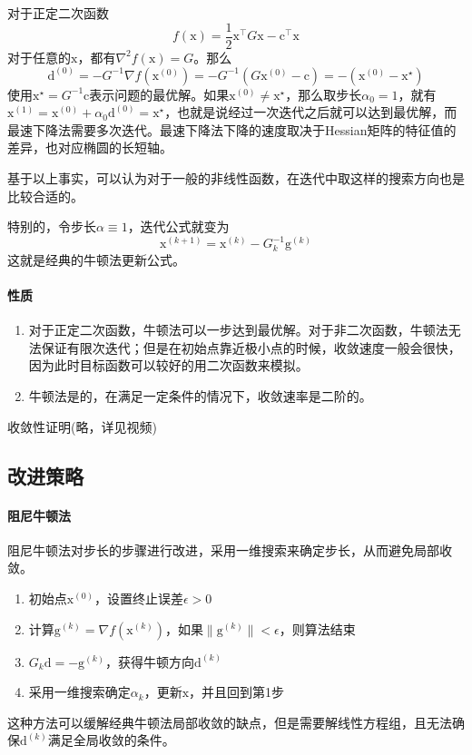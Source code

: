 \documentclass[a4paper]{D:/repositories/MyDGP/latex/PaperReadingLog}
\begin{document}
对于正定二次函数
$$
f(\mathrm{x})=\frac{1}{2}\mathrm{x}^\top G\mathrm{x}-\mathrm{c}^\top\mathrm{x}
$$
对于任意的$\mathrm{x}$，都有$\nabla^2f(\mathrm{x})=G$。那么
$$
\mathrm{d}^{(0)}=-G^{-1}\nabla f(\mathrm{x}^{(0)})=-G^{-1}(G\mathrm{x}^{(0)}-\mathrm{c})=-(\mathrm{x}^{(0)}-\mathrm{x}^\star)
$$
使用$\mathrm{x}^\star=G^{-1}\mathrm{c}$表示问题的最优解。如果$\mathrm{x}^{(0)}\neq\mathrm{x}^\star$，那么取步长$\alpha_0=1$，就有$\mathrm{x}^{(1)}=\mathrm{x}^{(0)}+\alpha_0\mathrm{d}^{(0)}=\mathrm{x}^\star$，也就是说经过一次迭代之后就可以达到最优解，而最速下降法需要多次迭代。最速下降法下降的速度取决于Hessian矩阵的特征值的差异，也对应椭圆的长短轴。

基于以上事实，可以认为对于一般的非线性函数，在迭代中取这样的搜索方向也是比较合适的。

特别的，令步长$\alpha\equiv 1$，迭代公式就变为
$$
\mathrm{x}^{(k+1)}=\mathrm{x}^{(k)}-G_k^{-1}\mathrm{g}^{(k)}
$$
这就是经典的牛顿法更新公式。

\paragraph{性质}
\begin{enumerate}
    \item 对于正定二次函数，牛顿法可以一步达到最优解。对于非二次函数，牛顿法无法保证有限次迭代；但是在初始点靠近极小点的时候，收敛速度一般会很快，因为此时目标函数可以较好的用二次函数来模拟。
    \item 牛顿法是的，在满足一定条件的情况下，收敛速率是二阶的。
\end{enumerate}
收敛性证明(略，详见视频)

\subsection{改进策略}
\paragraph{阻尼牛顿法}
阻尼牛顿法对步长的步骤进行改进，采用一维搜索来确定步长，从而避免局部收敛。
\begin{enumerate}
    \item {}初始点$\mathrm{x}^{(0)}$，设置终止误差$\epsilon>0$
    \item 计算$\mathrm{g}^{(k)}=\nabla f(\mathrm{x}^{(k)})$，如果$\lVert \mathrm{g}^{(k)} \lVert <\epsilon$，则算法结束
    \item {}$G_k\mathrm{d}=-\mathrm{g}^{(k)}$，获得牛顿方向$\mathrm{d}^{(k)}$
    \item 采用一维搜索确定$\alpha_k$，更新$\mathrm{x}$，并且回到第1步
\end{enumerate}
这种方法可以缓解经典牛顿法局部收敛的缺点，但是需要解线性方程组，且无法确保$\mathrm{d}^{(k)}$满足全局收敛的条件。
\end{document}
